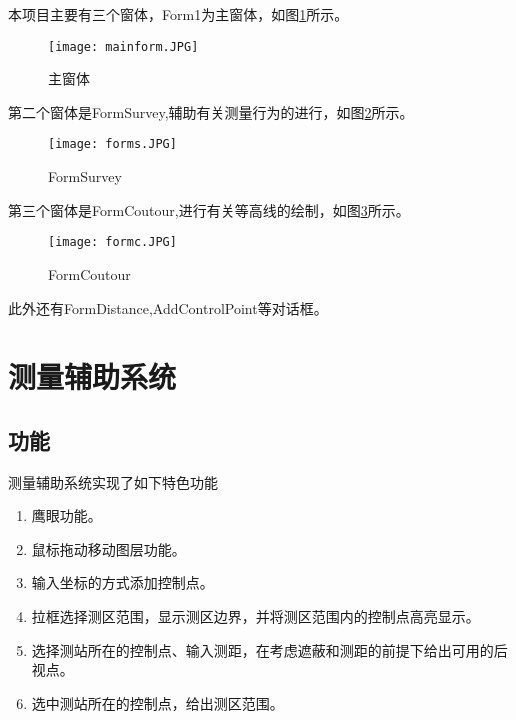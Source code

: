 \documentclass[twoside,color=blue,mathpazo,titlestyle=hang,12pt]{elegantbook}
\numberwithin{equation}{section}
\begin{document}
本项目主要有三个窗体，Form1为主窗体，如图\ref{fig:mainform}所示。
\begin{figure}[htbp]
\caption{主窗体}
\label{fig:mainform}
\centering
\texttt{[image: mainform.JPG]}
\end{figure}

第二个窗体是FormSurvey,辅助有关测量行为的进行，如图\ref{fig:forms}所示。
\begin{figure}[htbp]
\caption{FormSurvey}
\label{fig:forms}
\centering
\texttt{[image: forms.JPG]}
\end{figure}

第三个窗体是FormCoutour,进行有关等高线的绘制，如图\ref{fig:formc}所示。
\begin{figure}[htbp]
\caption{FormCoutour}
\label{fig:formc}
\centering
\texttt{[image: formc.JPG]}
\end{figure}

此外还有FormDistance,AddControlPoint等对话框。

\chapter{测量辅助系统}


\section{功能}
测量辅助系统实现了如下特色功能
\begin{enumerate}   
\item 鹰眼功能。
\item 鼠标拖动移动图层功能。
\item 输入坐标的方式添加控制点。
\item 拉框选择测区范围，显示测区边界，并将测区范围内的控制点高亮显示。
\item 选择测站所在的控制点、输入测距，在考虑遮蔽和测距的前提下给出可用的后视点。
\item 选中测站所在的控制点，给出测区范围。
\end{enumerate}
\end{document}
